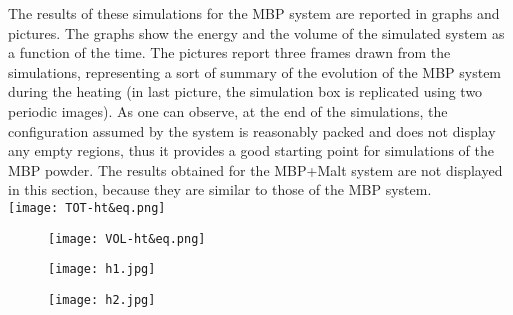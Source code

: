 \begin{itemize}
The results of these simulations for the MBP system are reported in graphs and pictures. The graphs show the energy and the volume of the simulated system as a function of the time. The pictures report three frames drawn from the simulations, representing a sort of summary of the evolution of the MBP system during the heating (in last picture, the simulation box is replicated using two periodic images). As one can observe, at the end of the simulations, the configuration assumed by the system is reasonably packed and does not display any empty regions, thus it provides a good starting point for simulations of the MBP powder. The results obtained for the MBP+Malt system are not displayed in this section, because they are similar to those of the MBP system. \\
\texttt{[image: TOT-ht\&eq.png]}

\begin{figure}[H]
\centering
\begin{minipage}[t]{0.95\textwidth}
	\centering
    \texttt{[image: VOL-ht\&eq.png]}
    
\end{minipage} 
\end{figure}

\begin{figure}[H]
\centering
\begin{minipage}[t]{0.85\textwidth}
	\centering
    \texttt{[image: h1.jpg]}

\vspace{0.35cm}    
    
    \texttt{[image: h2.jpg]}
    
\end{minipage} 
\end{figure}


\end{itemize}
